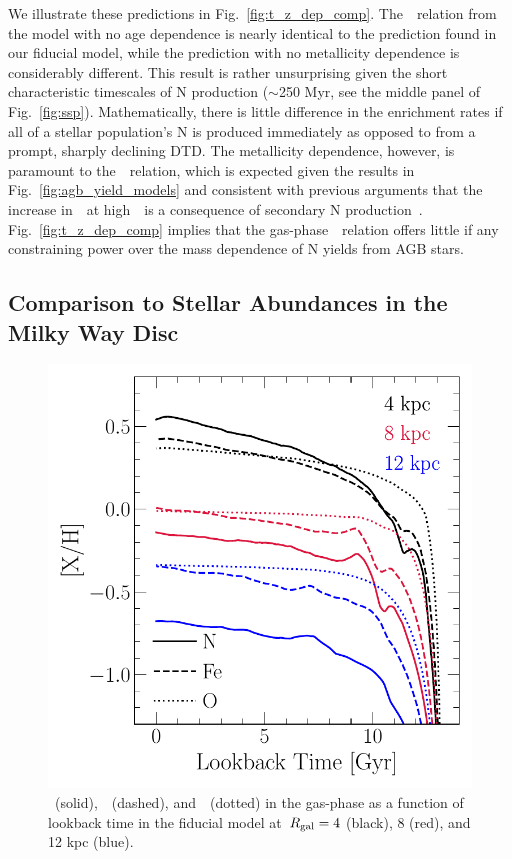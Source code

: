 \documentclass[ms.tex]{subfiles}
\begin{document}
We illustrate these predictions in Fig.~\ref{fig:t_z_dep_comp}.
The~\ohno~relation from the model with no age dependence is nearly identical to
the prediction found in our fiducial model, while the prediction with no
metallicity dependence is considerably different.
This result is rather unsurprising given the short characteristic timescales of
N production ($\sim$250 Myr, see the middle panel of Fig.~\ref{fig:ssp}).
Mathematically, there is little difference in the enrichment rates if all of a
stellar population's N is produced immediately as opposed to from a prompt,
sharply declining DTD.
The metallicity dependence, however, is paramount to the~\ohno~relation, which
is expected given the results in Fig.~\ref{fig:agb_yield_models} and consistent
with previous arguments that the increase in~\no~at high~\oh~is a consequence
of secondary N production~\citep{VilaCostas1993, vanZee1998, Henry1999,
PerezMontero2009, Berg2012, Pilyugin2012, Andrews2013, HaydenPawson2021}.
Fig.~\ref{fig:t_z_dep_comp} implies that the gas-phase~\ohno~relation offers
little if any constraining power over the mass dependence of N yields from
AGB stars.

\subsection{Comparison to Stellar Abundances in the Milky Way Disc}
\label{sec:results:vincenzo_comp}

\begin{figure}
\centering
\includegraphics[scale = 0.6]{nh_feh_vs_lookback.pdf}
\caption{
\nh~(solid),~\feh~(dashed), and~\oh~(dotted) in the gas-phase as a function of
lookback time in the fiducial model at~$R_\text{gal} = 4$ (black), 8 (red), and 12 kpc
(blue).
}
\label{fig:nh_feh_vs_lookback}
\end{figure}
\end{document}
